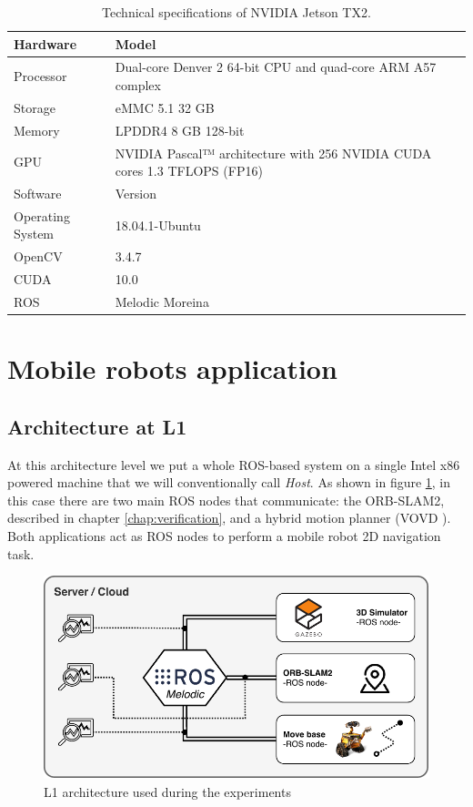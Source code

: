 \begin{table}[htbp]
	\centering
	\begin{tabularx}{\linewidth}{|l|X|}
		\hline
		\rowcolor{Gray}
		Hardware         & Model \\
		\hline
		Processor        & Dual-core Denver 2 64-bit CPU and quad-core ARM A57 complex \\
		Storage          & eMMC 5.1 32 GB \\
		Memory           & LPDDR4 8 GB 128-bit \\
		GPU              & NVIDIA Pascal™ architecture with 256 NVIDIA CUDA cores 1.3 TFLOPS (FP16) \\
		\hline
		\rowcolor{Gray}
		Software         & Version \\
		\hline
		Operating System & 18.04.1-Ubuntu \\
		OpenCV           & 3.4.7 \\
		CUDA             & 10.0  \\
		ROS              & Melodic Moreina \\
		\hline
	\end{tabularx}
	\caption{Technical specifications of NVIDIA Jetson TX2. \label{tab:tech-specs-tx2}}
\end{table}


\section{Mobile robots application}


\subsection{Architecture at L1}
At this architecture level we put a whole ROS-based system on a single Intel x86 powered machine that we will conventionally call \textit{Host}.
As shown in figure \ref{fig:l1archexp}, in this case there are two main ROS nodes that communicate: the ORB-SLAM2, described in chapter \ref{chap:verification}, and a hybrid motion planner (VOVD \cite{VOVD}). Both applications act as ROS nodes to perform a mobile robot 2D navigation task.

\begin{figure}[htbp]
	\centering
	\includegraphics[width=\textwidth]{images/L1-arch-exp}
	\caption{L1 architecture used during the experiments}
	\label{fig:l1archexp}
\end{figure}

